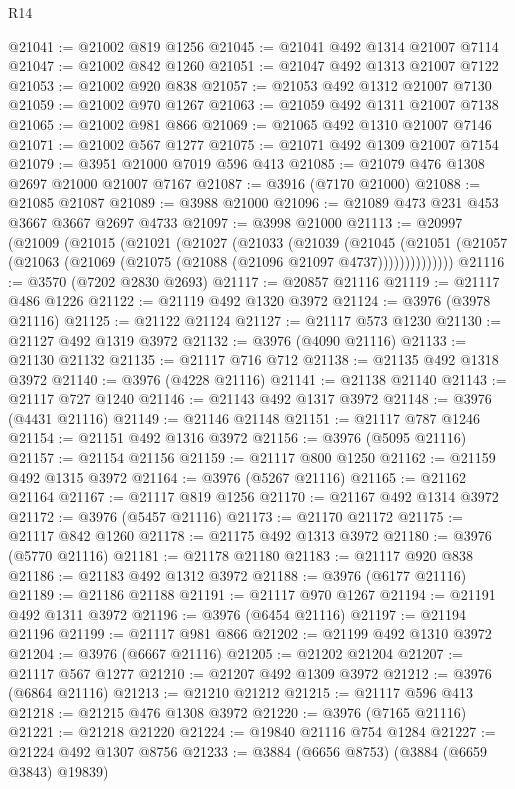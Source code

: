 \begin{lexlean}{R14}
\begin{coremodule}
@21041 := @21002 @819 @1256
@21045 := @21041 @492 @1314 @21007 @7114
@21047 := @21002 @842 @1260
@21051 := @21047 @492 @1313 @21007 @7122
@21053 := @21002 @920 @838
@21057 := @21053 @492 @1312 @21007 @7130
@21059 := @21002 @970 @1267
@21063 := @21059 @492 @1311 @21007 @7138
@21065 := @21002 @981 @866
@21069 := @21065 @492 @1310 @21007 @7146
@21071 := @21002 @567 @1277
@21075 := @21071 @492 @1309 @21007 @7154
@21079 := @3951 @21000 @7019 @596 @413
@21085 := @21079 @476 @1308 @2697 @21000 @21007 @7167
@21087 := @3916 (@7170 @21000)
@21088 := @21085 @21087
@21089 := @3988 @21000
@21096 := @21089 @473 @231 @453 @3667 @3667 @2697 @4733
@21097 := @3998 @21000
@21113 := @20997
    (@21009
      (@21015
        (@21021
          (@21027
            (@21033
              (@21039
                (@21045
                  (@21051 (@21057 (@21063 (@21069 (@21075 (@21088 (@21096 @21097 @4737))))))))))))))
@21116 := @3570 (@7202 @2830 @2693)
@21117 := @20857 @21116
@21119 := @21117 @486 @1226
@21122 := @21119 @492 @1320 @3972
@21124 := @3976 (@3978 @21116)
@21125 := @21122 @21124
@21127 := @21117 @573 @1230
@21130 := @21127 @492 @1319 @3972
@21132 := @3976 (@4090 @21116)
@21133 := @21130 @21132
@21135 := @21117 @716 @712
@21138 := @21135 @492 @1318 @3972
@21140 := @3976 (@4228 @21116)
@21141 := @21138 @21140
@21143 := @21117 @727 @1240
@21146 := @21143 @492 @1317 @3972
@21148 := @3976 (@4431 @21116)
@21149 := @21146 @21148
@21151 := @21117 @787 @1246
@21154 := @21151 @492 @1316 @3972
@21156 := @3976 (@5095 @21116)
@21157 := @21154 @21156
@21159 := @21117 @800 @1250
@21162 := @21159 @492 @1315 @3972
@21164 := @3976 (@5267 @21116)
@21165 := @21162 @21164
@21167 := @21117 @819 @1256
@21170 := @21167 @492 @1314 @3972
@21172 := @3976 (@5457 @21116)
@21173 := @21170 @21172
@21175 := @21117 @842 @1260
@21178 := @21175 @492 @1313 @3972
@21180 := @3976 (@5770 @21116)
@21181 := @21178 @21180
@21183 := @21117 @920 @838
@21186 := @21183 @492 @1312 @3972
@21188 := @3976 (@6177 @21116)
@21189 := @21186 @21188
@21191 := @21117 @970 @1267
@21194 := @21191 @492 @1311 @3972
@21196 := @3976 (@6454 @21116)
@21197 := @21194 @21196
@21199 := @21117 @981 @866
@21202 := @21199 @492 @1310 @3972
@21204 := @3976 (@6667 @21116)
@21205 := @21202 @21204
@21207 := @21117 @567 @1277
@21210 := @21207 @492 @1309 @3972
@21212 := @3976 (@6864 @21116)
@21213 := @21210 @21212
@21215 := @21117 @596 @413
@21218 := @21215 @476 @1308 @3972
@21220 := @3976 (@7165 @21116)
@21221 := @21218 @21220
@21224 := @19840 @21116 @754 @1284
@21227 := @21224 @492 @1307 @8756
@21233 := @3884 (@6656 @8753) (@3884 (@6659 @3843) @19839)

\end{coremodule}
\end{lexlean}
